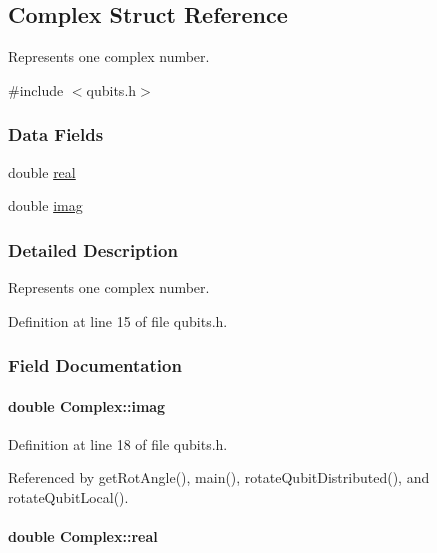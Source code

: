 \hypertarget{structComplex}{}\subsection{Complex Struct Reference}
\label{structComplex}


Represents one complex number.  




{\ttfamily \#include $<$qubits.\+h$>$}

\subsubsection*{Data Fields}
\begin{DoxyCompactItemize}
\item 
double \hyperlink{structComplex_a0138f5fe2b2c6180b8fcda77a7aa51c5}{real}
\item 
double \hyperlink{structComplex_a2bb90cc563599c3c8bdec9acf9ea40a6}{imag}
\end{DoxyCompactItemize}


\subsubsection{Detailed Description}
Represents one complex number. 

Definition at line 15 of file qubits.\+h.



\subsubsection{Field Documentation}
\paragraph[{\texorpdfstring{imag}{imag}}]{\setlength{\rightskip}{0pt plus 5cm}double Complex\+::imag}\hypertarget{structComplex_a2bb90cc563599c3c8bdec9acf9ea40a6}{}\label{structComplex_a2bb90cc563599c3c8bdec9acf9ea40a6}


Definition at line 18 of file qubits.\+h.



Referenced by get\+Rot\+Angle(), main(), rotate\+Qubit\+Distributed(), and rotate\+Qubit\+Local().

\paragraph[{\texorpdfstring{real}{real}}]{\setlength{\rightskip}{0pt plus 5cm}double Complex\+::real}\hypertarget{structComplex_a0138f5fe2b2c6180b8fcda77a7aa51c5}{}\label{structComplex_a0138f5fe2b2c6180b8fcda77a7aa51c5}


